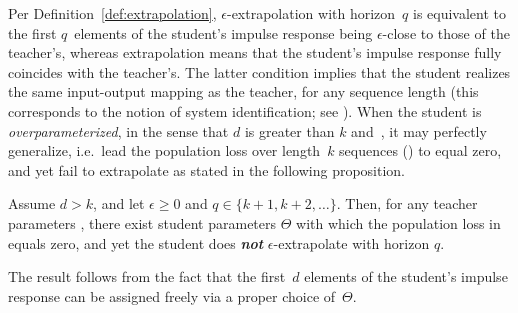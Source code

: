 Per Definition~\ref{def:extrapolation}, $\epsilon$-extrapolation with horizon~$q$ is equivalent to the first $q$~elements of the student's impulse response being $\epsilon$-close to those of the teacher's, whereas extrapolation means that the student's impulse response fully coincides with the teacher's.
The latter condition implies that the student realizes the same input-output mapping as the teacher, for any sequence length (this corresponds to the notion of system identification; see ).
When the student is \emph{overparameterized}, in the sense that $d$ is greater than $k$ and~, it may perfectly generalize, i.e.~lead the population loss over length~$k$ sequences () to equal zero, and yet fail to extrapolate as stated in the following proposition.
\begin{proposition}\label{prop:symmetric_lds_expressivity}
Assume $d > k$, and let $\epsilon \geq 0$ and $q \in \{ k + 1 , k + 2 , \ldots\}$.
Then, for any teacher parameters \smash{$\hat{\Theta}$}, there exist student parameters $\Theta$ with which the population loss in  equals zero, and yet the student does \emph{\textbf{not}} $\epsilon$-extrapolate with horizon $q$.
\end{proposition}
\begin{sproof}
The result follows from the fact that the first~$d$ elements of the student's impulse response can be assigned freely via a proper choice of~$\Theta$.
\end{sproof}
